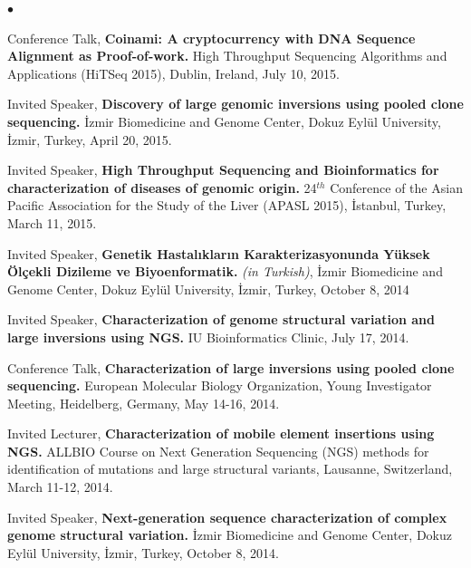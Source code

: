 \documentclass[margin,line]{res}
\newenvironment{list2}{
  \begin{list}{$\bullet$}{%
      \setlength{\itemsep}{0in}
      \setlength{\parsep}{0in} \setlength{\parskip}{0in}
      \setlength{\topsep}{0in} \setlength{\partopsep}{0in} 
      \setlength{\leftmargin}{0.2in}}}{\end{list}}
\begin{document}
\begin{resume}
\begin{list2}
\item
  Conference Talk, 
  {\bf Coinami: A cryptocurrency with DNA Sequence Alignment as Proof-of-work.}
  High Throughput Sequencing Algorithms and Applications (HiTSeq 2015), Dublin, Ireland, July 10, 2015.
\item
  Invited Speaker, 
  {\bf Discovery of large genomic inversions using pooled clone sequencing.}
  İzmir Biomedicine and Genome Center, Dokuz Eylül University, İzmir, Turkey, April 20, 2015.
\item
  Invited Speaker, 
  {\bf High Throughput Sequencing and Bioinformatics for characterization of diseases of genomic origin.}
  24$^{th}$ Conference of the Asian Pacific Association for the Study of the Liver (APASL 2015), İstanbul, Turkey, March 11, 2015.
\item
  Invited Speaker, 
  {\bf Genetik Hastalıkların Karakterizasyonunda Yüksek Ölçekli Dizileme ve Biyoenformatik.} {\it (in Turkish)},
  İzmir Biomedicine and Genome Center, Dokuz Eylül University, İzmir, Turkey, October 8, 2014

\item
  Invited Speaker, 
  {\bf Characterization of  genome structural variation and large inversions using NGS.}
  IU Bioinformatics Clinic, July 17, 2014. 
\item
  Conference Talk, 
  {\bf Characterization of large inversions using pooled clone sequencing.}
  European Molecular Biology Organization, Young Investigator Meeting, Heidelberg, Germany, May 14-16, 2014.

\item
  Invited Lecturer, 
  {\bf Characterization of mobile element insertions using NGS.}
  ALLBIO Course on Next Generation Sequencing (NGS) methods for identification of mutations and large structural variants,
  Lausanne, Switzerland, March 11-12, 2014.
\item
  Invited Speaker, 
  {\bf  Next-generation sequence characterization of complex genome structural variation.}
  İzmir Biomedicine and Genome Center, Dokuz Eylül University, İzmir, Turkey, October 8, 2014.


\end{list2}
\end{resume}
\end{document}
